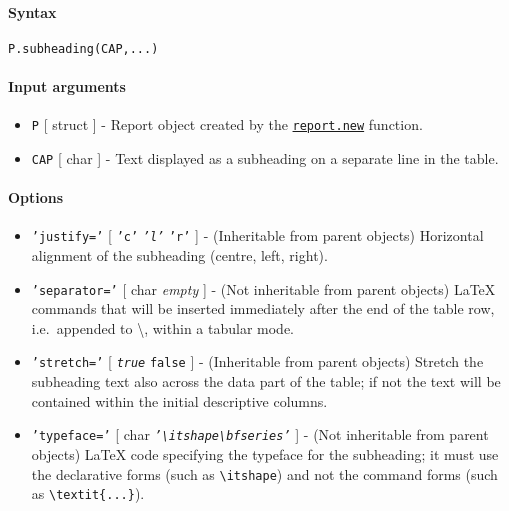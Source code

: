 


	\paragraph{Syntax}\label{syntax}

\begin{verbatim}
P.subheading(CAP,...)
\end{verbatim}

\paragraph{Input arguments}\label{input-arguments}

\begin{itemize}
\item
  \texttt{P} {[} struct {]} - Report object created by the
  \href{report/new}{\texttt{report.new}} function.
\item
  \texttt{CAP} {[} char {]} - Text displayed as a subheading on a
  separate line in the table.
\end{itemize}

\paragraph{Options}\label{options}

\begin{itemize}
\item
  \texttt{'justify='} {[} \texttt{'c'} \textbar{} \emph{\texttt{'l'}}
  \textbar{} \texttt{'r'} {]} - (Inheritable from parent objects)
  Horizontal alignment of the subheading (centre, left, right).
\item
  \texttt{'separator='} {[} char \textbar{} \emph{empty} {]} - (Not
  inheritable from parent objects) LaTeX commands that will be inserted
  immediately after the end of the table row, i.e.~appended to
  \textbackslash{}, within a tabular mode.
\item
  \texttt{'stretch='} {[} \emph{\texttt{true}} \textbar{} \texttt{false}
  {]} - (Inheritable from parent objects) Stretch the subheading text
  also across the data part of the table; if not the text will be
  contained within the initial descriptive columns.
\item
  \texttt{'typeface='} {[} char \textbar{}
  \emph{\texttt{'\textbackslash{}itshape\textbackslash{}bfseries'}} {]}
  - (Not inheritable from parent objects) LaTeX code specifying the
  typeface for the subheading; it must use the declarative forms (such
  as \texttt{\textbackslash{}itshape}) and not the command forms (such
  as \texttt{\textbackslash{}textit\{...\}}).
\end{itemize}

